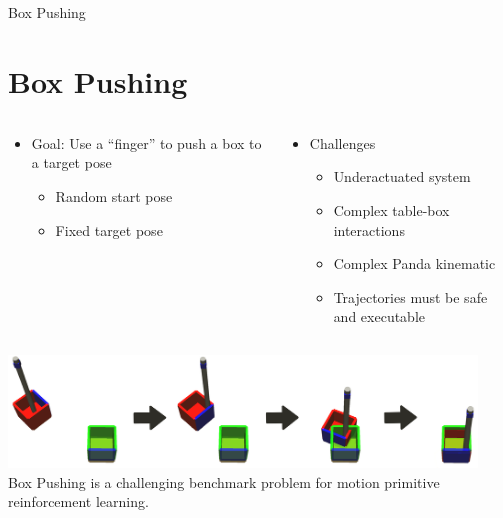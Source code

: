 \documentclass[16:9,en,navbarinfooter]{sdqbeamer}
\begin{document}
\begin{frame}{Box Pushing}
\section{Box Pushing}

\begin{columns}[t]
    \begin{column}{0.5\textwidth}
        \begin{itemize}
            \item Goal: Use a ``finger'' to push a box to a target pose
                \begin{itemize}
                    \item Random start pose
                    \item Fixed target pose
                \end{itemize}
        \end{itemize}
    \end{column}
    \begin{column}{0.5\textwidth}
        \begin{itemize}
                \item Challenges
                    \begin{itemize}
                            \item Underactuated system
                            \item Complex table-box interactions
                            \item Complex Panda kinematic 
                            \item Trajectories must be safe and executable
                    \end{itemize}
        \end{itemize}
    \end{column}


\end{columns}
\center
    \includegraphics[height=3cm]{media/2dboxpushing.png}
    \vspace{.1cm}\\
    Box Pushing is a challenging benchmark problem for motion primitive reinforcement learning.
\end{frame}
\end{document}
